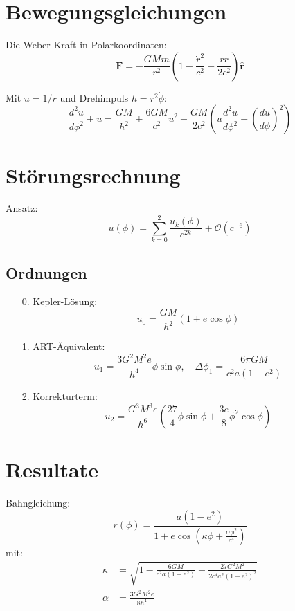 \section{Bewegungsgleichungen}
Die Weber-Kraft in Polarkoordinaten:
\begin{equation}
\mathbf{F} = -\frac{GMm}{r^2}\left(1 - \frac{\dot{r}^2}{c^2} + \frac{r\ddot{r}}{2c^2}\right)\mathbf{\hat{r}}
\end{equation}

Mit $u=1/r$ und Drehimpuls $h=r^2\dot{\phi}$:
\begin{equation}
\frac{d^2u}{d\phi^2} + u = \frac{GM}{h^2} + \frac{6GM}{c^2}u^2 + \frac{GM}{2c^2}\left(u\frac{d^2u}{d\phi^2} + \left(\frac{du}{d\phi}\right)^2\right)
\end{equation}

\section{Störungsrechnung}
Ansatz:
\begin{equation}
u(\phi) = \sum_{k=0}^2 \frac{u_k(\phi)}{c^{2k}} + \mathcal{O}(c^{-6})
\end{equation}

\subsection{Ordnungen}
\begin{itemize}
\item[0.] Kepler-Lösung:
\begin{equation}
u_0 = \frac{GM}{h^2}(1 + e\cos\phi)
\end{equation}

\item[1.] ART-Äquivalent:
\begin{equation}
u_1 = \frac{3G^2M^2e}{h^4}\phi\sin\phi,\quad \Delta\phi_1 = \frac{6\pi GM}{c^2a(1-e^2)}
\end{equation}

\item[2.] Korrekturterm:
\begin{equation}
u_2 = \frac{G^3M^3e}{h^6}\left(\frac{27}{4}\phi\sin\phi + \frac{3e}{8}\phi^2\cos\phi\right)
\end{equation}
\end{itemize}

\section{Resultate}
Bahngleichung:
\begin{equation}
r(\phi) = \frac{a(1-e^2)}{1 + e\cos\left(\kappa\phi + \frac{\alpha\phi^2}{c^4}\right)}
\end{equation}
mit:
\begin{align}
\kappa &= \sqrt{1 - \frac{6GM}{c^2a(1-e^2)} + \frac{27G^2M^2}{2c^4a^2(1-e^2)^2}}\\
\alpha &= \frac{3G^2M^2e}{8h^4}
\end{align}

